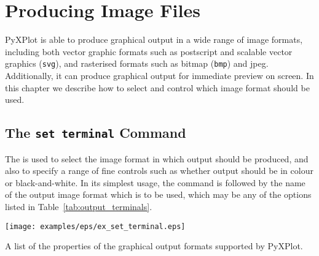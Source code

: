 %
%
%
%
%



\chapter{Producing Image Files}
\label{ch:image_formats}

PyXPlot is able to produce graphical output in a wide range of image formats,
including both vector graphic formats such as postscript and scalable vector
graphics ({\tt svg}), and rasterised formats such as bitmap ({\tt bmp}) and
jpeg. Additionally, it can produce graphical output for immediate preview on
screen. In this chapter we describe how to select and control which image
format should be used.

\section{The {\tt set terminal} Command}
\label{sec:set_terminal}

The  is used to select the image format in which output
should be produced, and also to specify a range of fine controls such as
whether output should be in colour or black-and-white. In its simplest usage,
the command is followed by the name of the output image format which is to be
used, which may be any of the options listed in Table~\ref{tab:output_terminals}.

\begin{table}
\centerline{\texttt{[image: examples/eps/ex\_set\_terminal.eps]}}
\caption{A list of the properties of the graphical output formats supported by PyXPlot.}
\label{tab:output_terminals}
\end{table}


